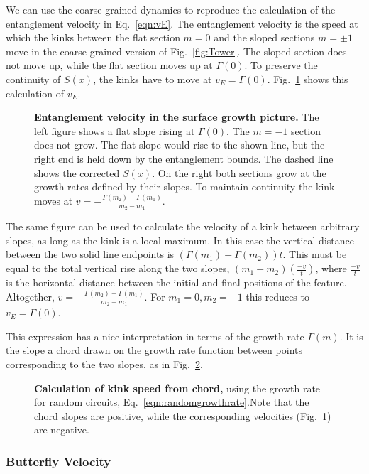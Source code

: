 We can use the coarse-grained dynamics to reproduce the calculation of the entanglement velocity in Eq.~\ref{eqn:vE}. The entanglement velocity is the speed at which the kinks between the flat section $m=0$ and the sloped sections $m=\pm1$ move in the coarse grained version of Fig.~\ref{fig:Tower}. The sloped section does not move up, while the flat section moves up at $\Gamma(0)$. To preserve the continuity of $S(x)$, the kinks have to move at $v_E=\Gamma(0)$. Fig.~\ref{fig:entanglevel} shows this calculation of $v_E$.
\begin{figure}
	\centering
	
	\caption{\textbf{Entanglement velocity in the surface growth picture.} The left figure shows a flat slope rising at $\Gamma(0)$. The $m=-1$ section does not grow. The flat slope would rise to the shown line, but the right end is held down by the entanglement bounds. The dashed line shows the corrected $S(x)$. On the right both sections grow at the growth rates defined by their slopes. To maintain continuity the kink moves at $v=-\frac{\Gamma(m_2)-\Gamma(m_1)}{m_2-m_1}$.}
	\label{fig:entanglevel}
\end{figure}

The same figure can be used to calculate the velocity of a kink between arbitrary slopes, as long as the kink is a local maximum. In this case the vertical distance between the two solid line endpoints is $(\Gamma(m_1)-\Gamma(m_2))t$. This must be equal to the total vertical rise along the two slopes, $(m_1-m_2)\left(\frac{-v}{t}\right)$, where $\frac{-v}{t}$ is the horizontal distance between the initial and final positions of the feature. Altogether, $v=-\frac{\Gamma(m_2)-\Gamma(m_1)}{m_2-m_1}$. For $m_1=0, m_2=-1$ this reduces to $v_E=\Gamma(0)$.

This expression has a nice interpretation in terms of the growth rate $\Gamma(m)$. It is the slope a chord drawn on the growth rate function between points corresponding to the two slopes, as in Fig.~\ref{fig:growthchord}.
\begin{figure}
	\centering
	
	\caption{\textbf{Calculation of kink speed from chord,} using the growth rate for random circuits, Eq.~\ref{eqn:randomgrowthrate}.Note that the chord slopes are positive, while the corresponding velocities (Fig.~\ref{fig:entanglevel}) are negative.}
	\label{fig:growthchord}
\end{figure}

\subsubsection{Butterfly Velocity} \label{subsub:v_B}

